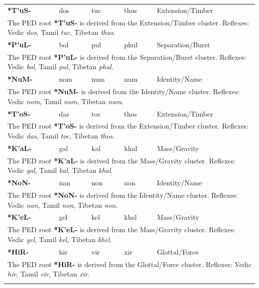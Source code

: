 \begin{longtable}{p{} p{} p{} p{} p{}}
\textbf{*T'uS-} & dos & tuc & thus & Extension/Timber \\ 
\multicolumn{5}{p{\textwidth}}{\small The PED root \textbf{*T'uS-} is derived from the Extension/Timber cluster. Reflexes: Vedic \textit{dos}, Tamil \textit{tuc}, Tibetan \textit{thus}. } \\ \addlinespace 
\textbf{*P'uL-} & bol & pul & phul & Separation/Burst \\ 
\multicolumn{5}{p{\textwidth}}{\small The PED root \textbf{*P'uL-} is derived from the Separation/Burst cluster. Reflexes: Vedic \textit{bol}, Tamil \textit{pul}, Tibetan \textit{phul}. } \\ \addlinespace 
\textbf{*NuM-} & nom & num & num & Identity/Name \\ 
\multicolumn{5}{p{\textwidth}}{\small The PED root \textbf{*NuM-} is derived from the Identity/Name cluster. Reflexes: Vedic \textit{nom}, Tamil \textit{num}, Tibetan \textit{num}. } \\ \addlinespace 
\textbf{*T'oS-} & das & toc & thos & Extension/Timber \\ 
\multicolumn{5}{p{\textwidth}}{\small The PED root \textbf{*T'oS-} is derived from the Extension/Timber cluster. Reflexes: Vedic \textit{das}, Tamil \textit{toc}, Tibetan \textit{thos}. } \\ \addlinespace 
\textbf{*K'aL-} & gal & kal & khal & Mass/Gravity \\ 
\multicolumn{5}{p{\textwidth}}{\small The PED root \textbf{*K'aL-} is derived from the Mass/Gravity cluster. Reflexes: Vedic \textit{gal}, Tamil \textit{kal}, Tibetan \textit{khal}. } \\ \addlinespace 
\textbf{*NoN-} & nan & non & non & Identity/Name \\ 
\multicolumn{5}{p{\textwidth}}{\small The PED root \textbf{*NoN-} is derived from the Identity/Name cluster. Reflexes: Vedic \textit{nan}, Tamil \textit{non}, Tibetan \textit{non}. } \\ \addlinespace 
\textbf{*K'eL-} & gel & kel & khel & Mass/Gravity \\ 
\multicolumn{5}{p{\textwidth}}{\small The PED root \textbf{*K'eL-} is derived from the Mass/Gravity cluster. Reflexes: Vedic \textit{gel}, Tamil \textit{kel}, Tibetan \textit{khel}. } \\ \addlinespace 
\textbf{*HiR-} & hir & vir & xir & Glottal/Force \\ 
\multicolumn{5}{p{\textwidth}}{\small The PED root \textbf{*HiR-} is derived from the Glottal/Force cluster. Reflexes: Vedic \textit{hir}, Tamil \textit{vir}, Tibetan \textit{xir}. } \\ \addlinespace 

\end{longtable}
